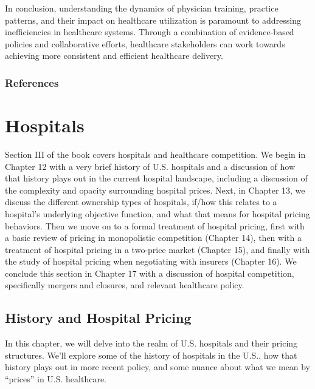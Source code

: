 \documentclass[
  letterpaper,
  DIV=11,
  numbers=noendperiod]{scrreport}
\theoremstyle{definition}
\theoremstyle{remark}
\begin{document}
In conclusion, understanding the dynamics of physician training,
practice patterns, and their impact on healthcare utilization is
paramount to addressing inefficiencies in healthcare systems. Through a
combination of evidence-based policies and collaborative efforts,
healthcare stakeholders can work towards achieving more consistent and
efficient healthcare delivery.

\hypertarget{references-3}{%
\section*{References}\label{references-3}}


\part{Hospitals}

Section III of the book covers hospitals and healthcare competition. We
begin in Chapter 12 with a very brief history of U.S. hospitals and a
discussion of how that history plays out in the current hospital
landscape, including a discussion of the complexity and opacity
surrounding hospital prices. Next, in Chapter 13, we discuss the
different ownership types of hospitals, if/how this relates to a
hospital's underlying objective function, and what that means for
hospital pricing behaviors. Then we move on to a formal treatment of
hospital pricing, first with a basic review of pricing in monopolistic
competition (Chapter 14), then with a treatment of hospital pricing in a
two-price market (Chapter 15), and finally with the study of hospital
pricing when negotiating with insurers (Chapter 16). We conclude this
section in Chapter 17 with a discussion of hospital competition,
specifically mergers and closures, and relevant healthcare policy.

\hypertarget{history-and-hospital-pricing}{%
\chapter{History and Hospital
Pricing}\label{history-and-hospital-pricing}}

In this chapter, we will delve into the realm of U.S. hospitals and
their pricing structures. We'll explore some of the history of hospitals
in the U.S., how that history plays out in more recent policy, and some
nuance about what we mean by ``prices'' in U.S. healthcare.
\end{document}
